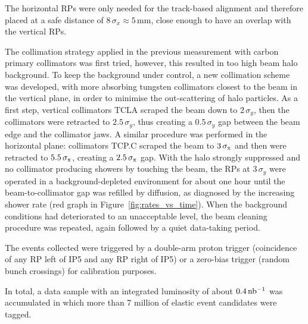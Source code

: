 The horizontal RPs were only needed for the track-based alignment and therefore placed at a safe distance of $8\,\sigma_{x} \approx 5$\,mm, close enough to have an overlap with the vertical RPs.

The collimation strategy applied in the previous measurement \cite{totem-8tev-1km} with carbon primary collimators was first tried, however, this resulted in too high beam halo background. To keep the background under control, a new collimation scheme was developed, with more absorbing tungsten collimators closest to the beam in the vertical plane, in order to minimise the out-scattering of halo particles. As a first step, vertical collimators TCLA scraped the beam down to $2\,\sigma_{y}$, then the collimators were retracted to $2.5\,\sigma_{y}$, thus creating a $0.5\,\sigma_{y}$ gap between the beam edge and the collimator jaws. A similar procedure was performed in the horizontal plane: collimators TCP.C scraped the beam to $3\,{\rm \sigma_{x}}$ and then were retracted to $5.5\,{\rm \sigma_{x}}$, creating a $2.5\,{\rm \sigma_x}$ gap. With the halo strongly suppressed and no collimator producing showers by touching the beam, the RPs at $3\,\sigma_{y}$ were operated in a background-depleted environment for about one hour until the beam-to-collimator gap was refilled by diffusion, as diagnosed by the increasing shower rate (red graph in Figure~\ref{fig:rates_vs_time}). When the background conditions had deteriorated to an unacceptable level, the beam cleaning procedure was repeated, again followed by a quiet data-taking period.

The events collected were triggered by a double-arm proton trigger (coincidence of any RP left of IP5 and any RP right of IP5) or a zero-bias trigger (random bunch crossings) for calibration purposes.

In total, a data sample with an integrated luminosity of about $0.4\,\rm nb^{-1}$ was accumulated in which more than 7 million of elastic event candidates were tagged.
